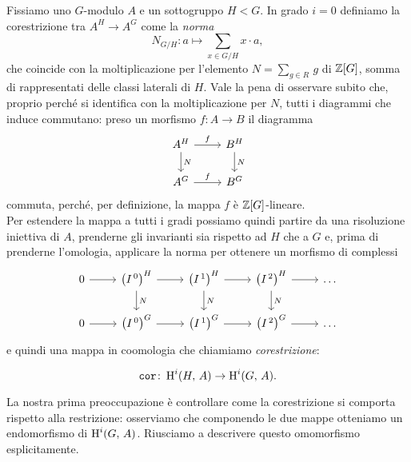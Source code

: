 \begin{definition}[Corestrizione]
Fissiamo uno $ G $-modulo $ A $ e un sottogruppo $ H < G $. In grado $ i = 0 $ definiamo la corestrizione tra $ A^H \to A^G $  come la \emph{norma}
\[N_{G/H} \colon a \mapsto \sum_{x \in G/H} x \cdot a, \]
che coincide con la moltiplicazione per l'elemento $ N = \sum_{g \in R} \, g $ di $ \mathbb{Z}[G] $, somma di rappresentati delle classi laterali di $ H $. Vale la pena di osservare subito che, proprio perché si identifica con la moltiplicazione per $ N $, tutti i diagrammi che induce commutano: preso un morfismo $ f \colon A \to B $ il diagramma
\[\begin{tikzcd}
A^H \rar["f"] \dar{N} 
& B^H \arrow[d, "N"]\\
A^G \rar["f"]
& B^G
\end{tikzcd}\] 
commuta, perché, per definizione, la mappa $ f $ è $ \mathbb{Z}[G] $-lineare. \\

Per estendere la mappa a tutti i gradi possiamo quindi partire da una risoluzione iniettiva di $ A $, prenderne gli invarianti sia rispetto ad $ H $ che a $ G $ e, prima di prenderne l'omologia, applicare la norma per ottenere un morfismo di complessi
\[\begin{tikzcd}
0 \rar
& \left(I^{\,0}\right)^H \rar \dar["N"]
& \left(I^{\,1}\right)^H \rar \dar["N"]
& \left(I^{\,2}\right)^H \rar \dar["N"]
& \dots \\
0 \rar
& \left(I^{\,0}\right)^{G} \rar
& \left(I^{\,1}\right)^{G} \rar
& \left(I^{\,2}\right)^{G} \rar
& \dots
\end{tikzcd} \]
e quindi una mappa in coomologia che chiamiamo \emph{corestrizione}:

\[ \operatorname{\mathtt{cor}} \colon \operatorname{H}^i(H, \, A) \to \operatorname{H}^i(G, \, A). \]

\end{definition}

La nostra prima preoccupazione è controllare come la corestrizione si comporta rispetto alla restrizione: osserviamo che componendo le due mappe otteniamo un endomorfismo di $ \operatorname{H}^i(G, \, A) $. Riusciamo a descrivere questo omomorfismo esplicitamente.

